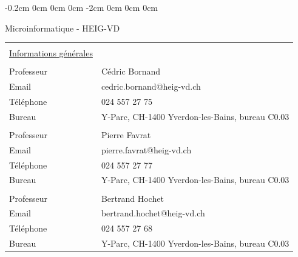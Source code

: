 \documentclass[10pt,a4paper]{book}
\begin{document}

\setlength{\textheight}{23cm}

\changepage{1.5cm}%
           {-0.2cm}%
           {0cm}%
           {0cm}%
           {0cm}%
           {-2cm}%
           {0cm}%
           {0cm}%
           {0cm}%
 \setcounter{page}{1}

\newpage
{} \setcounter{page}{1}


\begin{center}
Microinformatique - HEIG-VD

\end{center}

\begin{tabular}{p{4cm}p{10cm}}
&\\
\underline{Informations générales}& \\
&\\
Professeur & Cédric Bornand\\
Email & cedric.bornand@heig-vd.ch\\
Téléphone & 024 557 27 75 \\
Bureau & Y-Parc, CH-1400 Yverdon-les-Bains, bureau C0.03
\\
\-
\\
Professeur & Pierre Favrat\\
Email & pierre.favrat@heig-vd.ch\\
Téléphone & 024 557 27 77 \\
Bureau & Y-Parc, CH-1400 Yverdon-les-Bains, bureau C0.03
\\
\-
\\
Professeur & Bertrand Hochet\\
Email & bertrand.hochet@heig-vd.ch\\
Téléphone & 024 557 27 68 \\
Bureau & Y-Parc, CH-1400 Yverdon-les-Bains, bureau C0.03
\\
\end{tabular} \\
\end{document}
